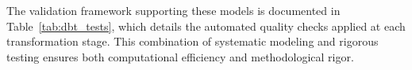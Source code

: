 The validation framework supporting these models is documented in Table~\ref{tab:dbt_tests}, which details the automated quality checks applied at each transformation stage. This combination of systematic modeling and rigorous testing ensures both computational efficiency and methodological rigor.

